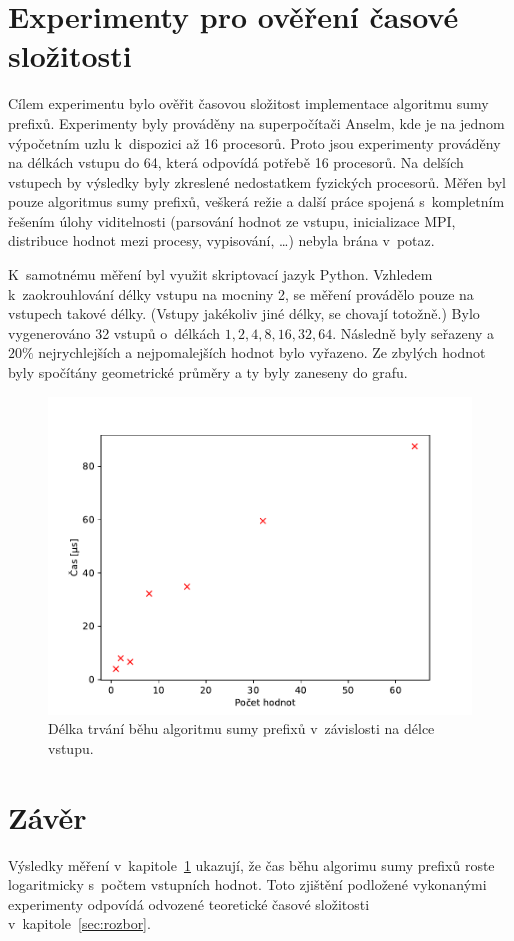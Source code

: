 \documentclass[11pt, a4paper, titlepage]{article}
\begin{document}

\section{Experimenty pro ověření časové složitosti}\label{sec:experimenty}

Cílem experimentu bylo ověřit časovou složitost implementace algoritmu
sumy prefixů.
Experimenty byly prováděny na superpočítači Anselm, kde je na jednom
výpočetním uzlu k~dispozici až 16 procesorů.
Proto jsou experimenty prováděny na délkách vstupu do 64, která odpovídá
potřebě 16 procesorů.
Na delších vstupech by výsledky byly zkreslené nedostatkem
fyzických procesorů.
Měřen byl pouze algoritmus sumy prefixů, veškerá režie a další práce
spojená s~kompletním řešením úlohy viditelnosti (parsování hodnot ze vstupu,
inicializace MPI, distribuce hodnot mezi procesy, vypisování, \ldots)
nebyla brána v~potaz.

K~samotnému měření byl využit skriptovací jazyk Python.
Vzhledem k~zaokrouhlování délky vstupu na mocniny 2, se měření provádělo pouze na
vstupech takové délky. (Vstupy jakékoliv jiné délky, se chovají totožně.)
Bylo vygenerováno 32 vstupů o~délkách $1, 2, 4, 8, 16, 32, 64$.
Následně byly seřazeny a $20\%$ nejrychlejších a nejpomalejších hodnot bylo vyřazeno.
Ze zbylých hodnot byly spočítány geometrické průměry a ty byly zaneseny do grafu.

\begin{figure}[H]
    \centering
    \includegraphics[width=.8\textwidth]{chart.pdf}
    \caption{Délka trvání běhu algoritmu sumy prefixů v~závislosti na délce vstupu.}
\end{figure}


\section{Závěr}\label{sec:zaver}

Výsledky měření v~kapitole~\ref{sec:experimenty} ukazují, že čas běhu
algorimu sumy prefixů roste logaritmicky s~počtem vstupních hodnot.
Toto zjištění podložené vykonanými experimenty odpovídá odvozené
teoretické časové složitosti v~kapitole~\ref{sec:rozbor}.

\end{document}

